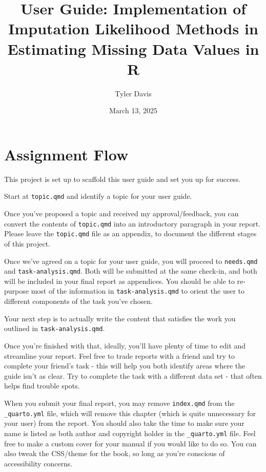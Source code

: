 \documentclass[
  letterpaper,
  DIV=11,
  numbers=noendperiod]{scrreprt}
\title{User Guide: Implementation of Imputation Likelihood Methods in
Estimating Missing Data Values in R}
\author{Tyler Davis}
\date{March 13, 2025}
\renewcommand*\contentsname{Table of contents}
\newcommand\contentsname{Table of contents}
\begin{document}
\maketitle

\renewcommand*\contentsname{Table of contents}
{
\hypersetup{linkcolor=}
\setcounter{tocdepth}{2}
\tableofcontents
}

\chapter*{Assignment Flow}\label{assignment-flow}


This project is set up to scaffold this user guide and set you up for
success.

Start at \texttt{topic.qmd} and identify a topic for your user guide.

Once you've proposed a topic and received my approval/feedback, you can
convert the contents of \texttt{topic.qmd} into an introductory
paragraph in your report. Please leave the \texttt{topic.qmd} file as an
appendix, to document the different stages of this project.

Once we've agreed on a topic for your user guide, you will proceed to
\texttt{needs.qmd} and \texttt{task-analysis.qmd}. Both will be
submitted at the same check-in, and both will be included in your final
report as appendices. You should be able to re-purpose most of the
information in \texttt{task-analysis.qmd} to orient the user to
different components of the task you've chosen.

Your next step is to actually write the content that satisfies the work
you outlined in \texttt{task-analysis.qmd}.

Once you're finished with that, ideally, you'll have plenty of time to
edit and streamline your report. Feel free to trade reports with a
friend and try to complete your friend's task - this will help you both
identify areas where the guide isn't as clear. Try to complete the task
with a different data set - that often helps find trouble spots.

When you submit your final report, you may remove \texttt{index.qmd}
from the \texttt{\_quarto.yml} file, which will remove this chapter
(which is quite unnecessary for your user) from the report. You should
also take the time to make sure your name is listed as both author and
copyright holder in the \texttt{\_quarto.yml} file. Feel free to make a
custom cover for your manual if you would like to do so. You can also
tweak the CSS/theme for the book, so long as you're conscious of
accessibility concerns.
\end{document}
